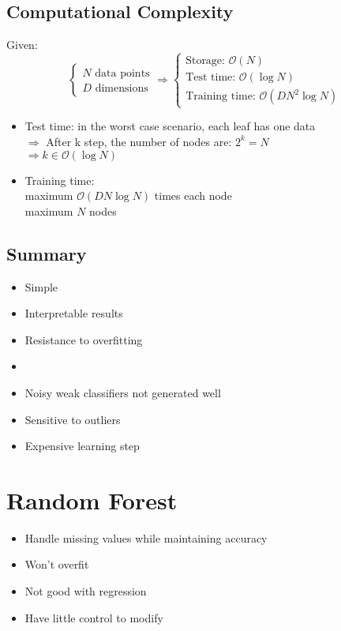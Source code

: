 \subsection{Computational Complexity}
Given:
\begin{equation*}
	\begin{cases}
		N \text{ data points}\\
		D \text{ dimensions}
	\end{cases} \Rightarrow \begin{cases}
	\text{Storage: } \mathcal{O}(N)\\
	\text{Test time: } \mathcal{O}(\log N)\\
	\text{Training time: } \mathcal{O}(DN^2 \log N)
	\end{cases}
\end{equation*}

\begin{itemize}
	\item Test time: in the worst case scenario, each leaf has one data\\
	$\Rightarrow$ After k step, the number of nodes are: $2^k = N$\\
	$\Rightarrow k \in \mathcal{O} (\log N)$
	\item Training time:\\
	maximum $\mathcal{O}(DN\log N)$ times each node\\
	maximum $N$ nodes
\end{itemize}

\subsection{Summary}
\begin{itemize}
	\item Simple
	\item Interpretable results
	\item Resistance to overfitting
	\item {} 
	\item Noisy weak classifiers not generated well
	\item Sensitive to outliers 
	\item Expensive learning step
\end{itemize}

\section{Random Forest}
\begin{itemize}
	\item Handle missing values while maintaining accuracy
	\item Won't overfit
	\item Not good with regression
	\item Have little control to modify
\end{itemize}

